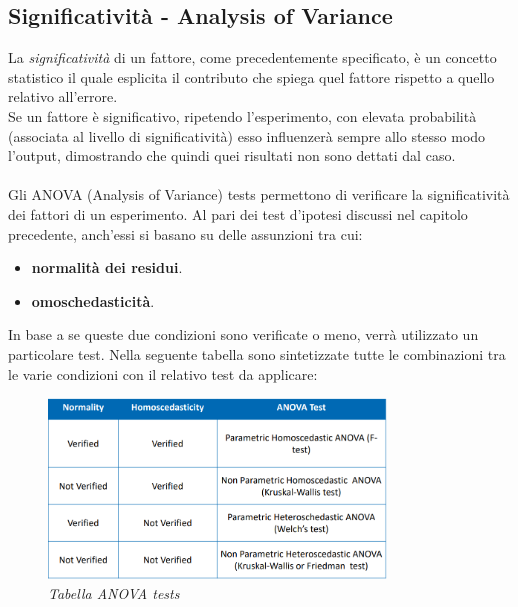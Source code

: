 \subsection{Significatività - Analysis of Variance}
La \textit{significatività} di un fattore, come precedentemente specificato, è un concetto statistico il quale esplicita il contributo che spiega quel fattore rispetto a quello relativo all'errore.
\\Se un fattore è significativo, ripetendo l'esperimento, con elevata probabilità (associata al livello di significatività) esso influenzerà sempre allo stesso modo l'output, dimostrando che quindi quei risultati non sono dettati dal caso.
\\
\\Gli ANOVA (Analysis of Variance) tests permettono di verificare la significatività dei fattori di un esperimento. Al pari dei test d'ipotesi discussi nel capitolo precedente, anch'essi si basano su delle assunzioni tra cui:
\begin{itemize}
	\item \textbf{normalità dei residui}.
	\item \textbf{omoschedasticità}.
\end{itemize}
In base a se queste due condizioni sono verificate o meno, verrà utilizzato un particolare test. Nella seguente tabella sono sintetizzate tutte le combinazioni tra le varie condizioni con il relativo test da applicare:
\begin{figure}[H]
	\centering
	\includegraphics[width=0.8\textwidth]{img/hw4/ANOVATests.png}
	\caption{\textit{Tabella ANOVA tests}}
	\label{table}
\end{figure}
